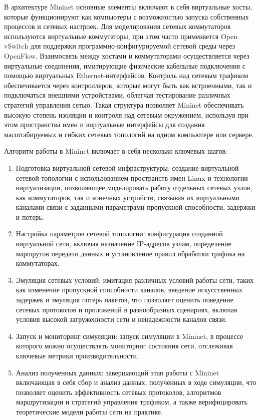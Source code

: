 В архитектуре Mininet основные элементы включают в себя виртуальные хосты, 
которые функционируют как компьютеры с возможностью запуска собственных 
процессов и сетевых настроек. Для моделирования сетевых коммутаторов 
используются виртуальные коммутаторы, при этом часто применяется Open vSwitch для 
поддержки программно-конфигурируемой сетевой среды через OpenFlow. Взаимосвязь между 
хостами и коммутаторами осуществляется через виртуальные соединения, имитирующие физические 
кабельные подключения с помощью виртуальных Ethernet-интерфейсов. Контроль над сетевым трафиком 
обеспечивается через контроллеров, которые могут быть как встроенными, так и подключаться внешними 
устройствами, облегчая тестирование различных стратегий управления сетью. Такая структура позволяет 
Mininet обеспечивать высокую степень изоляции и контроля над сетевым окружением, используя при этом 
пространства имен и виртуальные интерфейсы для создания масштабируемых и гибких сетевых топологий 
на одном компьютере или сервере.

Алгоритм работы в Mininet включает в себя несколько ключевых шагов:
\begin{enumerate}
\item Подготовка виртуальной сетевой инфраструктуры: создание виртуальной сетевой топологии с использованием пространств имен Linux и технологии виртуализации, позволяющее моделировать работу отдельных сетевых узлов, как коммутаторов, так и конечных устройств, связывая их виртуальными каналами связи с заданными параметрами пропускной способности, задержки и потерь.
\item Настройка параметров сетевой топологии: конфигурация созданной виртуальной сети, включая назначение IP-адресов узлам, определение маршрутов передачи данных и установление правил обработки трафика на коммутаторах.
\item Эмуляция сетевых условий: имитация различных условий работы сети, таких как изменение пропускной способности каналов, введение искусственных задержек и эмуляция потерь пакетов, что позволяет оценить поведение сетевых протоколов и приложений в разнообразных сценариях, включая условия высокой загруженности сети и ненадежности каналов связи.
\item Запуск и мониторинг симуляции: запуск симуляции в Mininet, в процессе которого можно осуществлять мониторинг состояния сети, отслеживая ключевые метрики производительности.
\item Анализ полученных данных: завершающий этап работы с Mininet включающая в себя сбор и анализ данных, полученных в ходе симуляции, что позволяет оценить эффективность сетевых протоколов, алгоритмов маршрутизации и стратегий управления трафиком, а также верифицировать теоретические модели работы сети на практике.
\end{enumerate}

